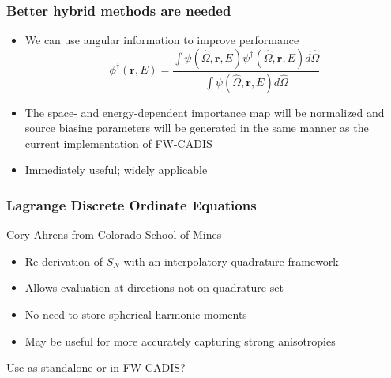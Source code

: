 \documentclass[xcolor=x11names,compress]{beamer}
\renewcommand{\(}{\begin{columns}}
\renewcommand{\)}{\end{columns}}
\newcommand{\<}[1]{\begin{column}{#1}}
\renewcommand{\>}{\end{column}}
\newcommand{\vOmega}{\ensuremath{\hat{\Omega}}}
\newcommand{\ve}[1]{\ensuremath{\mathbf{#1}}}
\begin{document}
\begin{frame}[fragile]
  \frametitle{Better hybrid methods are needed}

	\begin{itemize}
	\item We can use angular information to improve performance
		\begin{equation}
		\phi^{\dagger}(\ve{r},E) = \frac{\int \psi(\vOmega, \ve{r},E) \psi^{\dagger}(\vOmega, \ve{r},E) d\vOmega}{\int \psi(\vOmega, \ve{r},E)  d\vOmega}
		\end{equation}

	\item The space- and energy-dependent importance map will be normalized and source biasing parameters will be generated in the same manner as the current implementation of FW-CADIS
	\item Immediately useful; widely applicable
	\end{itemize}

\end{frame}


\begin{frame}[fragile]
  \frametitle{Lagrange Discrete Ordinate Equations}

    Cory Ahrens from Colorado School of Mines
	\begin{itemize}
	\item Re-derivation of $S_N$ with an interpolatory quadrature framework
	\item Allows evaluation at directions not on quadrature set
	\item No need to store spherical harmonic moments
	\item May be useful for more accurately capturing strong anisotropies
	\end{itemize}
	
	Use as standalone or in FW-CADIS?

\end{frame}

\end{document}
